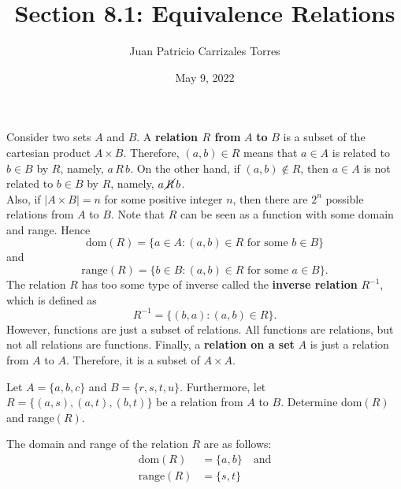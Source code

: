 \documentclass[12pt]{article}
\newenvironment{problem}[2][Problem]{\begin{trivlist}
		\item[\hskip \labelsep {\bfseries #1}\hskip \labelsep {\bfseries #2.}]}{\end{trivlist}}
\newenvironment{solution}[2][Solution]{\begin{trivlist}
		\item[\hskip \labelsep {\bfseries #1}\hskip \labelsep {\bfseries #2.}]}{\end{trivlist}}
\begin{document}
 
	
	\title{Section 8.1: Equivalence Relations}
	\author{Juan Patricio Carrizales Torres}
	\date{May 9, 2022}
	\maketitle
	
	Consider two sets $A$ and $B$. A \textbf{relation $R$ from} $A$ \textbf{to} $B$ is a subset of the cartesian product $A\times B$. Therefore, $(a,b)\in R$ means that $a\in A$ is related to $b\in B$ by $R$, namely, $a \, R \, b$. On the other hand, if $(a,b)\not\in R$, then $a\in A$ is not related to $b\in B$ by $R$, namely, $a \, \cancel R \, b$.\\
	
	 Also, if $|A\times B| = n$ for some positive integer $n$, then there are $2^{n}$ possible relations from $A$ to $B$. Note that $R$ can be seen as a function with some domain and range. Hence
	\begin{equation*}
		\text{dom}(R) = \{a\in A: (a,b)\in R \text{ for some } b\in B\}
	\end{equation*} 
	and
	\begin{equation*}
		\text{range}(R) = \{b\in B: (a,b)\in R \text{ for some } a\in B\}.
	\end{equation*}
	The relation $R$ has too some type of inverse called the \textbf{inverse relation} $R^{-1}$, which is defined as
	\begin{equation*}
		R^{-1} =\{(b,a):(a,b)\in R\}.
	\end{equation*}
	However, functions are just a subset of relations. All functions are relations, but not all relations are functions.
	Finally, a \textbf{relation on a set} $A$ is just a relation from $A$ to $A$. Therefore, it is a subset of $A\times A$.
	
	\begin{problem}{1}
		Let $A=\{a,b,c\}$ and $B=\{r,s,t,u\}$. Furthermore, let $R=\{(a,s),(a,t),(b,t)\}$ be a relation from $A$ to $B$. Determine dom$(R)$ and range$(R)$.
		\begin{solution}{1}
			The domain and range of the relation $R$ are as follows:
			\begin{align*}
				\text{dom}(R) &= \{a,b\} \quad \text{and}\\
				\text{range}(R) &= \{s,t\}
			\end{align*}
		\end{solution}
	\end{problem}
\end{document}
